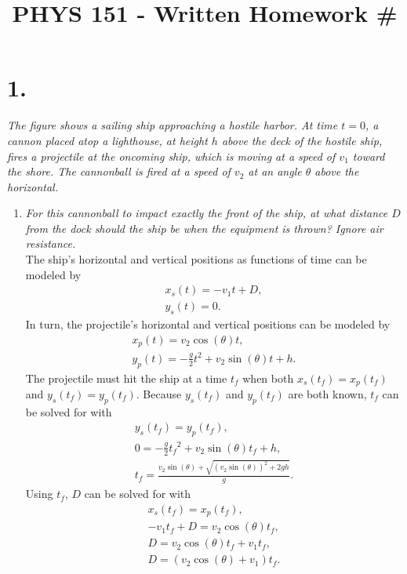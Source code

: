 \documentclass[12pt]{article}
\title{\vspace{-2\baselineskip}PHYS 151 - Written Homework \#\HOMEWORKNUM}
\author{\NAME}
\date{\DATE}
\begin{document}
\maketitle


\section*{1.}
\textit{The figure shows a sailing ship approaching a hostile harbor. At time
$t = 0$, a cannon placed atop a lighthouse, at height $h$ above the deck of
the hostile ship, fires a projectile at the oncoming ship, which is moving at
a speed of $v_1$ toward the shore. The cannonball is fired at a speed of $v_2$
at an angle $\theta$ above the horizontal.}
\begin{enumerate}[label=(\alph*)]
	\item \textit{For this cannonball to impact exactly the front of the ship,
	at what distance $D$ from the dock should the ship be when the equipment
	is thrown? Ignore air resistance.} \\[\baselineskip]
	The ship's horizontal and vertical positions as functions of time can be
	modeled by
	\begin{gather*}
		x_s(t) = -v_1t + D, \\
		y_s(t) = 0.
	\end{gather*}
	In turn, the projectile's horizontal and vertical positions can be modeled
	by
	\begin{gather*}
		x_p(t) = v_2\cos(\theta)t, \\
		y_p(t) = -\frac{g}{2}t^2 + v_2\sin(\theta)t + h.
	\end{gather*}
	The projectile must hit the ship at a time $t_f$ when both
	$x_s(t_f) = x_p(t_f)$ and $y_s(t_f) = y_p(t_f)$. Because $y_s(t_f)$ and
	$y_p(t_f)$ are both known, $t_f$ can be solved for with
	\begin{gather*}
		y_s(t_f) = y_p(t_f), \\
		0 = -\frac{g}{2}{t_f}^2 + v_2\sin(\theta)t_f + h, \\
		t_f = \frac{v_2\sin(\theta) + \sqrt{(v_2\sin(\theta))^2 + 2gh}}{g}.
	\end{gather*}
	Using $t_f$, $D$ can be solved for with
	\begin{gather*}
		x_s(t_f) = x_p(t_f), \\
		-v_1t_f + D = v_2\cos(\theta)t_f, \\
		D = v_2\cos(\theta)t_f + v_1t_f, \\
		D = (v_2\cos(\theta) + v_1) t_f.
	\end{gather*}

\end{enumerate}
\end{document}
